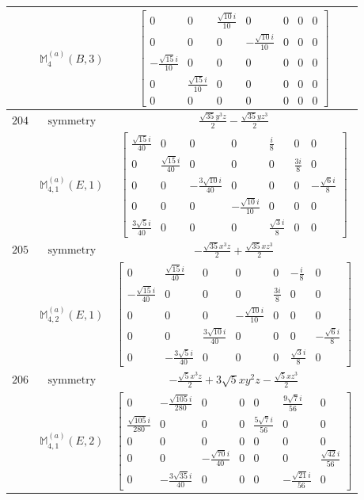 \documentclass[fleqn,8pt,landscape]{jsarticle}
\begin{document}
\begin{longtable}{ccc}
$  $ & $ \mathbb{M}_{4}^{(a)}(B,3) $ & $ \begin{bmatrix} 0 & 0 & \frac{\sqrt{10} i}{10} & 0 & 0 & 0 & 0 \\ 0 & 0 & 0 & - \frac{\sqrt{10} i}{10} & 0 & 0 & 0 \\ - \frac{\sqrt{15} i}{10} & 0 & 0 & 0 & 0 & 0 & 0 \\ 0 & \frac{\sqrt{15} i}{10} & 0 & 0 & 0 & 0 & 0 \\ 0 & 0 & 0 & 0 & 0 & 0 & 0 \end{bmatrix} $ \\ \hline
$ 204 $ & $ \text{symmetry} $ & $ \frac{\sqrt{35} y^{3} z}{2} - \frac{\sqrt{35} y z^{3}}{2} $ \\
$  $ & $ \mathbb{M}_{4,1}^{(a)}(E,1) $ & $ \begin{bmatrix} \frac{\sqrt{15} i}{40} & 0 & 0 & 0 & \frac{i}{8} & 0 & 0 \\ 0 & \frac{\sqrt{15} i}{40} & 0 & 0 & 0 & \frac{3 i}{8} & 0 \\ 0 & 0 & - \frac{3 \sqrt{10} i}{40} & 0 & 0 & 0 & - \frac{\sqrt{6} i}{8} \\ 0 & 0 & 0 & - \frac{\sqrt{10} i}{10} & 0 & 0 & 0 \\ \frac{3 \sqrt{5} i}{40} & 0 & 0 & 0 & \frac{\sqrt{3} i}{8} & 0 & 0 \end{bmatrix} $ \\ \hline
$ 205 $ & $ \text{symmetry} $ & $ - \frac{\sqrt{35} x^{3} z}{2} + \frac{\sqrt{35} x z^{3}}{2} $ \\
$  $ & $ \mathbb{M}_{4,2}^{(a)}(E,1) $ & $ \begin{bmatrix} 0 & \frac{\sqrt{15} i}{40} & 0 & 0 & 0 & - \frac{i}{8} & 0 \\ - \frac{\sqrt{15} i}{40} & 0 & 0 & 0 & \frac{3 i}{8} & 0 & 0 \\ 0 & 0 & 0 & - \frac{\sqrt{10} i}{10} & 0 & 0 & 0 \\ 0 & 0 & \frac{3 \sqrt{10} i}{40} & 0 & 0 & 0 & - \frac{\sqrt{6} i}{8} \\ 0 & - \frac{3 \sqrt{5} i}{40} & 0 & 0 & 0 & \frac{\sqrt{3} i}{8} & 0 \end{bmatrix} $ \\ \hline
$ 206 $ & $ \text{symmetry} $ & $ - \frac{\sqrt{5} x^{3} z}{2} + 3 \sqrt{5} x y^{2} z - \frac{\sqrt{5} x z^{3}}{2} $ \\
$  $ & $ \mathbb{M}_{4,1}^{(a)}(E,2) $ & $ \begin{bmatrix} 0 & - \frac{\sqrt{105} i}{280} & 0 & 0 & 0 & \frac{9 \sqrt{7} i}{56} & 0 \\ \frac{\sqrt{105} i}{280} & 0 & 0 & 0 & \frac{5 \sqrt{7} i}{56} & 0 & 0 \\ 0 & 0 & 0 & 0 & 0 & 0 & 0 \\ 0 & 0 & - \frac{\sqrt{70} i}{40} & 0 & 0 & 0 & \frac{\sqrt{42} i}{56} \\ 0 & - \frac{3 \sqrt{35} i}{40} & 0 & 0 & 0 & - \frac{\sqrt{21} i}{56} & 0 \end{bmatrix} $ \\ \hline

\end{longtable}
\end{document}
